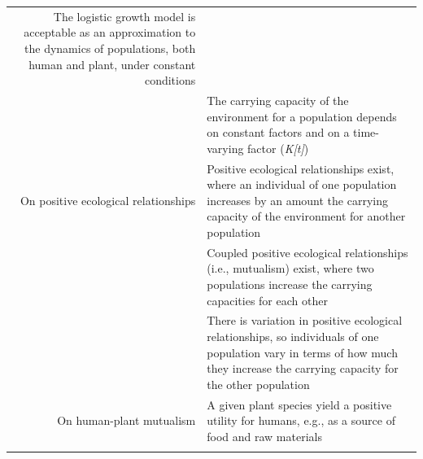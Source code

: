 \documentclass[
]{book}
\begin{document}
\begin{longtable}[]{@{}rl@{}}
\begin{minipage}[t]{0.49\columnwidth}
The logistic growth model is acceptable as an approximation to the dynamics of populations, both human and plant, under constant conditions\strut
\end{minipage}\tabularnewline
\begin{minipage}[t]{0.45\columnwidth}\raggedleft
﻿\strut
\end{minipage} & \begin{minipage}[t]{0.49\columnwidth}\raggedright
The carrying capacity of the environment for a population depends on constant factors and on a time-varying factor (\emph{K{[}t{]}})\strut
\end{minipage}\tabularnewline
\begin{minipage}[t]{0.45\columnwidth}\raggedleft
On positive ecological relationships\strut
\end{minipage} & \begin{minipage}[t]{0.49\columnwidth}\raggedright
Positive ecological relationships exist, where an individual of one population increases by an amount the carrying capacity of the environment for another population\strut
\end{minipage}\tabularnewline
\begin{minipage}[t]{0.45\columnwidth}\raggedleft
﻿\strut
\end{minipage} & \begin{minipage}[t]{0.49\columnwidth}\raggedright
Coupled positive ecological relationships (i.e., mutualism) exist, where two populations increase the carrying capacities for each other\strut
\end{minipage}\tabularnewline
\begin{minipage}[t]{0.45\columnwidth}\raggedleft
﻿\strut
\end{minipage} & \begin{minipage}[t]{0.49\columnwidth}\raggedright
There is variation in positive ecological relationships, so individuals of one population vary in terms of how much they increase the carrying capacity for the other population\strut
\end{minipage}\tabularnewline
\begin{minipage}[t]{0.45\columnwidth}\raggedleft
On human-plant mutualism\strut
\end{minipage} & \begin{minipage}[t]{0.49\columnwidth}\raggedright
A given plant species yield a positive utility for humans, e.g., as a source of food and raw materials\strut
\end{minipage}\tabularnewline
\begin{minipage}[t]{0.45\columnwidth}\raggedleft

\end{minipage}
\end{longtable}
\end{document}
